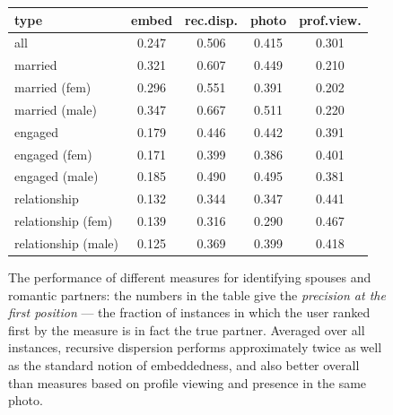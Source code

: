 \documentclass{sigchi}
\def\rs{\vspace*{-0.10in}}
\begin{document}
\begin{figure}
\begin{center}
\begin{tabular}{|l|c|c|c|c|}
\hline
type & embed & \mbox{rec.disp.} & \mbox{photo} & \mbox{prof.view.}
\\\hline
all & 0.247 & 0.506 & 0.415 & 0.301 \\ \hline 
married & 0.321 & 0.607 & 0.449 & 0.210 \\ \hline 
married (fem) & 0.296 & 0.551 & 0.391 & 0.202 \\ \hline 
married (male) & 0.347 & 0.667 & 0.511 & 0.220 \\ \hline 
engaged & 0.179 & 0.446 & 0.442 & 0.391 \\ \hline 
engaged (fem) & 0.171 & 0.399 & 0.386 & 0.401 \\ \hline 
engaged (male) & 0.185 & 0.490 & 0.495 & 0.381 \\ \hline 
relationship & 0.132 & 0.344 & 0.347 & 0.441 \\ \hline 
relationship (fem) & 0.139 & 0.316 & 0.290 & 0.467 \\ \hline 
relationship (male) & 0.125 & 0.369 & 0.399 & 0.418 \\ \hline 
\end{tabular}
\caption{
\label{table:results}
The performance of different measures for identifying
spouses and romantic partners: the numbers in the table give
the {\em precision at the first position} --- the fraction of
instances in which the user ranked first by the measure is
in fact the true partner.
Averaged over all instances, 
recursive dispersion performs approximately twice as well
as the standard notion of embeddedness, and also better overall than
measures based on profile viewing and presence in the same photo.
\rs 
}
\end{center}
\end{figure}
\end{document}
